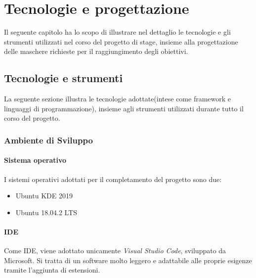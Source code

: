 
\chapter{Tecnologie e progettazione}
\label{cap:progettazione-codifica}
Il seguente capitolo ha lo scopo di illustrare nel dettaglio le tecnologie e gli strumenti utilizzati nel corso del progetto di stage, insieme alla progettazione delle maschere richieste per il raggiungimento degli obiettivi. 

\section{Tecnologie e strumenti}
La seguente sezione illustra le tecnologie adottate(intese come framework e linguaggi di programmazione), insieme agli strumenti utilizzati durante tutto il corso del progetto.

\subsection{Ambiente di Sviluppo}

\subsubsection{Sistema operativo}
I sistemi operativi adottati per il completamento del progetto sono due:
\begin{itemize}
	\item Ubuntu KDE 2019
	\item Ubuntu 18.04.2 LTS
\end{itemize}

\subsubsection{IDE}
Come \gls{IDE}, viene adottato unicamente \textit{Visual Studio Code}, sviluppato da Microsoft. Si tratta di un software molto leggero e adattabile alle proprie esigenze tramite l'aggiunta di estensioni.
